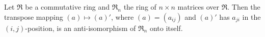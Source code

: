 Let $\Re$ be a commutative ring and $\Re_n$ the ring of $n \times n$ matrices over $\Re$. Then the transpose mapping $(a) \mapsto (a)'$, where $(a) = (a_{ij})$ and $(a)'$ has $a_{ji}$ in the $(i,j)$-position, is an anti-isomorphism of $\Re_n$ onto itself.
